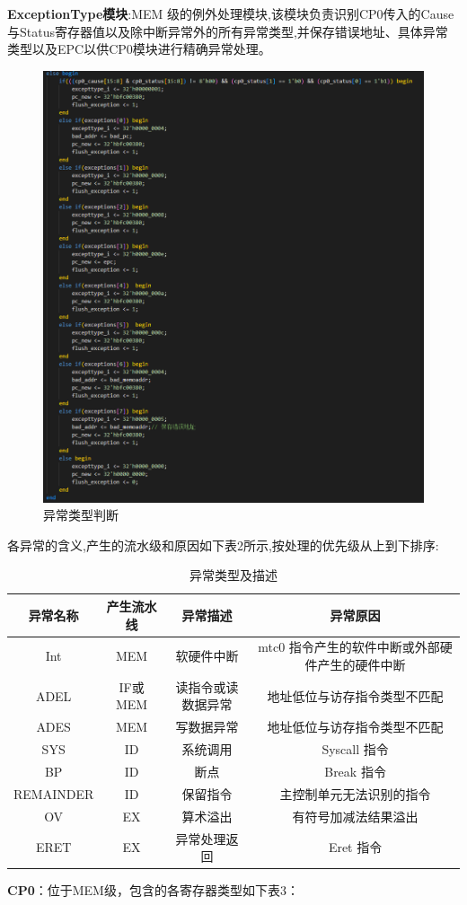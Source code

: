 \textbf{ExceptionType模块}:MEM 级的例外处理模块,该模块负责识别CP0传入的Cause与Status寄存器值以及除中断异常外的所有异常类型,并保存错误地址、具体异常类型以及EPC以供CP0模块进行精确异常处理。 
\begin{figure}
\centering
\includegraphics[width=0.5\linewidth]{image/p5.png}
\caption{异常类型判断}
\label{fig:enter-label}
\end{figure}

各异常的含义,产生的流水级和原因如下表2所示,按处理的优先级从上到下排序:


\begin{table}[h]
\centering
\begin{tabular}{|c|c|c|c|} \hline 
	异常名称&  产生流水线&  异常描述& 异常原因\\ \hline 
	Int&  MEM&  软硬件中断&  mtc0 指令产生的软件中断或外部硬件产生的硬件中断\\ \hline 
	ADEL&  IF或MEM&  读指令或读数据异常& 地址低位与访存指令类型不匹配\\ \hline 
	ADES&  MEM&  写数据异常& 地址低位与访存指令类型不匹配\\ \hline 
	SYS&  ID&  系统调用& Syscall 指令\\ \hline 
	BP&  ID&  断点& Break 指令\\ \hline 
	REMAINDER&  ID&  保留指令& 主控制单元无法识别的指令\\ \hline 
	OV&  EX&  算术溢出& 有符号加减法结果溢出\\ \hline
	ERET& EX& 异常处理返回&Eret 指令\\\hline
\end{tabular}
\caption{异常类型及描述}
\label{tab:my_label}
\end{table}

\textbf{CP0}：位于MEM级，包含的各寄存器类型如下表3：


